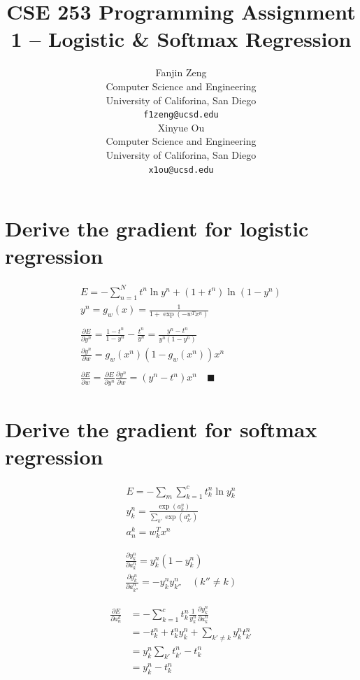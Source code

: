 \documentclass{article}
\title{CSE 253 Programming Assignment 1 -- Logistic \& Softmax Regression}
\author{
  Fanjin Zeng \\
  Computer Science and Engineering\\
  University of Califorina, San Diego\\
  \texttt{f1zeng@ucsd.edu} \\
   \And
   Xinyue Ou \\
   Computer Science and Engineering\\
   University of Califorina, San Diego \\
   \texttt{x1ou@ucsd.edu} \\
}
\begin{document}
\maketitle

\section{Derive the gradient for logistic regression}
\begin{equation*}
\begin{gathered}
	E = - \sum_{n=1}^{N}{t^n\ln y^n + (1+t^n) \ln (1-y^n)} \\
	y^n = g_w(x) = \frac{1}{1 + \exp(-w^Tx^n)}\\
	\\
	\frac{\partial E}{\partial y^n} = \frac{1-t^n}{1-y^n}- \frac{t^n}{y^n} = \frac{y^n - t^n}{y^n(1-y^n)}\\
	\frac{\partial y^n}{\partial w} = g_w(x^n) (1-g_w(x^n)) x^n\\
	\\
	\frac{\partial E}{\partial w} = \frac{\partial E}{\partial y^n} \frac{\partial y^n}{\partial w} = (y^n - t^n) x^n	\quad\blacksquare
\end{gathered}
\end{equation*}


\section{Derive the gradient for softmax regression}
\begin{equation*}
\begin{gathered}
	E = - \sum_m \sum_{k=1}^{c} t_k^n \ln y_k^n \\
	y_k^n = \frac{\exp (a_k^n)}{\sum_{k'} \exp(a_{k'}^n)} \\
	a_n^k = w_k^T x^n
\end{gathered}
\end{equation*}

\begin{equation*}
\begin{gathered}
	\frac{\partial y_k^n}{\partial a_k^n} = y_k^n (1 - y_k^n) \\
	\frac{\partial y_k^n}{\partial a_{k''}^n} = - y_k^n y_{k''}^n \quad (k'' \ne k) 
\end{gathered}
\end{equation*}

\begin{equation*}
\begin{split}
	\frac{\partial E}{\partial a_n^k} &= - \sum_{k=1}^{c} t_k^n \frac{1}{y_k^n} \frac{\partial y_k^n}{\partial a_k^n}  \\
	&= -t_k^n + t_k^n y_k^n + \sum_{k' \ne k} y_k^n t_{k'}^n\\
	&= y_k^n \sum_{k'}t_{k'}^n - t_k^n \\
	&= y_k^n - t_k^n
\end{split}
\end{equation*}
\end{document}
